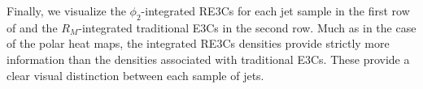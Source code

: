 Finally, we visualize the \(\phi_2\)-integrated RE3Cs for each jet sample in the first row of  and the \(R_M\)-integrated traditional E3Cs in the second row.
%
Much as in the case of the polar heat maps, the integrated RE3Cs densities provide strictly more information than the densities associated with traditional E3Cs. These provide a clear visual distinction between each sample of jets.

\begin{figure}[t]
    \centering
    \\
\end{figure}
